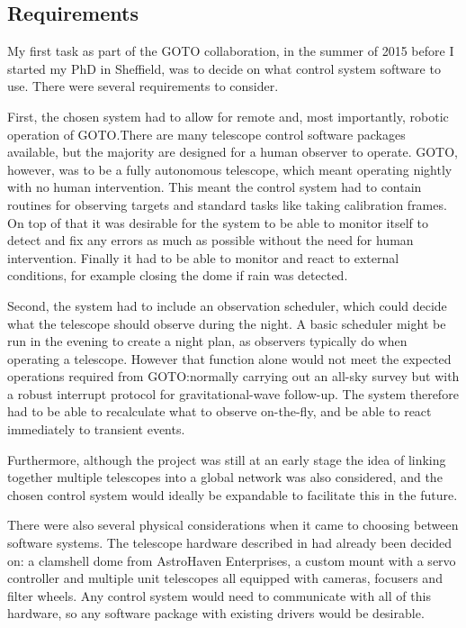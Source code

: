\subsection{Requirements}
\label{sec:control_requirements}
\begin{colsection}

My first task as part of the GOTO collaboration, in the summer of 2015 before I started my PhD in Sheffield, was to decide on what control system software to use. There were several requirements to consider.

First, the chosen system had to allow for remote and, most importantly, robotic operation of GOTO.\@ There are many telescope control software packages available, but the majority are designed for a human observer to operate. GOTO, however, was to be a fully autonomous telescope, which meant operating nightly with no human intervention. This meant the control system had to contain routines for observing targets and standard tasks like taking calibration frames. On top of that it was desirable for the system to be able to monitor itself to detect and fix any errors as much as possible without the need for human intervention. Finally it had to be able to monitor and react to external conditions, for example closing the dome if rain was detected.

Second, the system had to include an observation scheduler, which could decide what the telescope should observe during the night. A basic scheduler might be run in the evening to create a night plan, as observers typically do when operating a telescope. However that function alone would not meet the expected operations required from GOTO:\@ normally carrying out an all-sky survey but with a robust interrupt protocol for gravitational-wave follow-up. The system therefore had to be able to recalculate what to observe on-the-fly, and be able to react immediately to transient  events.

Furthermore, although the project was still at an early stage the idea of linking together multiple telescopes into a global network was also considered, and the chosen control system would ideally be expandable to facilitate this in the future.

There were also several physical considerations when it came to choosing between software systems. The telescope hardware described in  had already been decided on: a clamshell dome from AstroHaven Enterprises, a custom mount with a  servo controller and multiple unit telescopes all equipped with  cameras, focusers and filter wheels. Any control system would need to communicate with all of this hardware, so any software package with existing drivers would be desirable.


\end{colsection}
